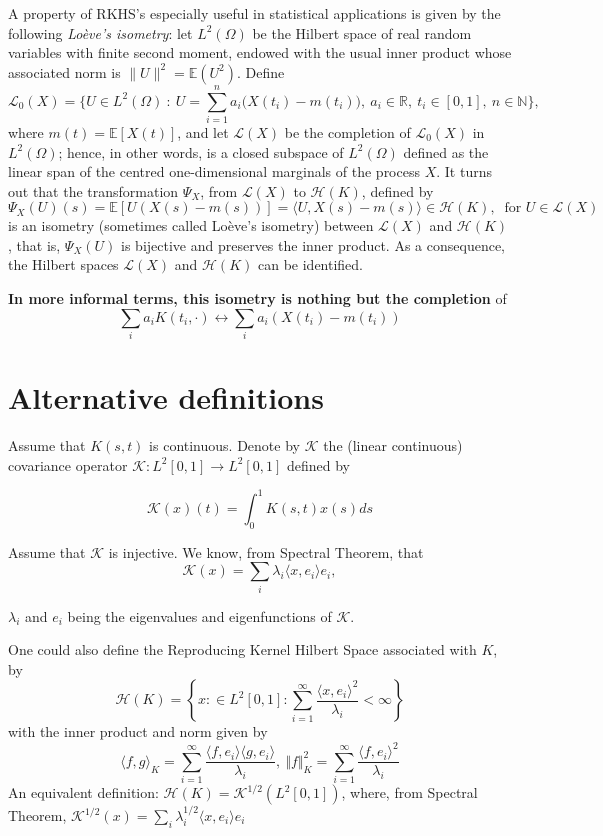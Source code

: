 \documentclass[11pt]{article}
\def\calh{{\mathcal{H}}}
\def\call{{\mathcal{L}}}
\begin{document}
	A property of RKHS's especially useful in statistical applications is given by the following \textit{Lo\`eve's isometry}:  let $L^2(\Omega) $ be the Hilbert space of real random variables with finite second moment, endowed with the usual inner product whose associated norm is $\| U\|^2={\mathbb E}(U^2)$. Define
	$$\call_0(X) = \big\{U\in L^2(\Omega) \ : \ U=\sum_{i=1}^n a_i \big(X(t_i)-m(t_i)\big),\ a_i\in{\mathbb R},\ t_i\in[0,1],\ n\in{\mathbb N}\big\},$$
	where $m(t)={\mathbb E}[X(t)]$, and let $\call(X)$ be the completion of $\call_0(X)$ in  $L^2(\Omega)$; hence, in other words, is a closed subspace of $L^2(\Omega)$ defined as the linear span of the centred one-dimensional marginals of the process $X$. It turns out that the transformation $\Psi_X$, from  $\call(X)$ to $\calh(K)$, defined by
	\begin{equation}\label{eq:isometry}
	\Psi_X(U)(s) = {\mathbb E}[ U(X(s)-m(s))] = \langle U, X(s)-m(s) \rangle \in \calh(K), \ \text{ for } U\in \call(X)
	\end{equation}
	is an isometry (sometimes called Lo\`eve's isometry) between $\call(X)$ and $\calh(K)$, that is, $\Psi_X(U)$ is bijective and preserves the inner product. As a consequence, the Hilbert spaces $\call(X)$ and $\calh(K)$ can be identified.

	\textbf{In more informal terms, this isometry is nothing but the completion} of
	$$
	\sum_ia_iK(t_i,\cdot)\longleftrightarrow \sum_ia_i(X(t_i)-m(t_i))
	$$

\section*{Alternative definitions}

	Assume that $K(s,t)$ is continuous. Denote by ${\mathcal K}$ the (linear continuous) covariance operator ${\mathcal K}:L^2[0,1]\rightarrow L^2[0,1]$ defined by

	$$
	{\mathcal K}(x)(t)=\int_0^1K(s,t)x(s)ds
	$$

	Assume that ${\mathcal K}$ is injective.
	We know, from Spectral Theorem, that
	$${\mathcal K}(x)=\sum_i\lambda_i\langle x,e_i\rangle e_i,$$

	$\lambda_i$ and $e_i$ being the eigenvalues and eigenfunctions of ${\mathcal K}$.

		One could also define the Reproducing Kernel Hilbert Space associated with $K$, by
$$
	{\mathcal H}(K)=\left\{x:\in L^2[0,1]:  \sum_{i=1}^\infty\frac{\langle x,e_i\rangle^2}{\lambda_i} <\infty \right\}
	$$
	with the inner product and norm given by
	$$
	\langle f,g\rangle_K=\sum_{i=1}^\infty \frac{\langle f,e_i\rangle \langle g,e_i\rangle}{\lambda_i},\ \Vert f\Vert_K^2=\sum_{i=1}^\infty \frac{\langle f,e_i\rangle^2 }{\lambda_i}
	$$
An equivalent definition:
	${\mathcal H}(K)={\mathcal K}^{1/2}(L^2[0,1])$,
	where, from Spectral Theorem, ${\mathcal K}^{1/2}(x)=\sum_i\lambda_i^{1/2}\langle x,e_i\rangle e_i$
\end{document}
